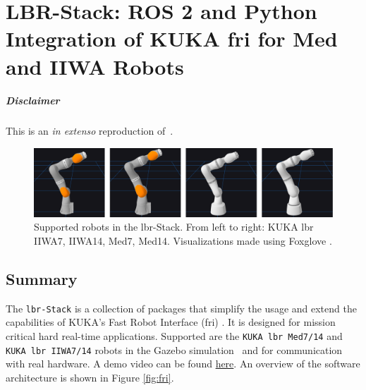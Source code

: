 \chapter[LBR-Stack]{LBR-Stack: ROS 2 and Python Integration of KUKA \acrshort{fri} for Med and
IIWA Robots}
\label{app:lbr_stack}
\minitoc

\paragraph{Disclaimer} This  is an \textit{in extenso} reproduction of~\cite{huber2023lbr}.

\newpage

\begin{figure}
\centering
\includegraphics[width=\textwidth]{appendix_a/img/joss_figure.png}
\caption[Supported robots in the \acrshort{lbr}-Stack. From left to right: KUKA \acrshort{lbr}
IIWA7, IIWA14, Med7, Med14. Visualizations made using Foxglove
.]{Supported robots in the \acrshort{lbr}-Stack. From left to right: KUKA \acrshort{lbr}
IIWA7, IIWA14, Med7, Med14. Visualizations made using Foxglove
\footnotemark{}.}
\end{figure}

\hypertarget{summary}{%
\section{Summary}\label{summary}}
The \texttt{\acrshort{lbr}-Stack} is a collection of packages that simplify the
usage and extend the capabilities of KUKA's Fast Robot Interface (\acrshort{fri})
\cite{ref-fri}. It is designed
for mission critical hard real-time applications. Supported are the
\texttt{KUKA\ \acrshort{lbr}\ Med7/14} and \texttt{KUKA\ \acrshort{lbr}\ IIWA7/14} robots in
the Gazebo simulation~\cite{ref-gazebo} and for communication with real hardware. A demo video can be
found
\href{https://www.linkedin.com/posts/mhubii_robotics-opensource-ros2-activity-7009974676017848320-S3U5/?utm_source=share\&utm_medium=member_desktop}{here}.
An overview of the software architecture is shown in Figure
\ref{fig:fri}.

